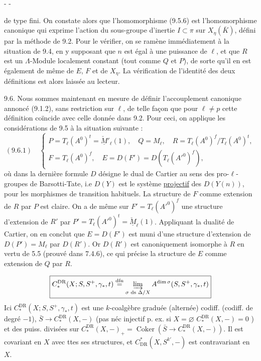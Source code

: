 \begin{center}-  -\end{center}

de type fini. On constate alors que l'homomorphisme (9.5.6) est l'homomorphisme canonique qui exprime l'action du sous-groupe d'inertie $I\subset\pi$ sur $X_\eta(\bar K)$, défini par la méthode de 9.2. Pour le vérifier, on se ramène immédiatement à la situation de 9.4, en y supposant que $n$ est égal à une puissance de $\ell$, et que $R$ est un $\Lambda$-Module localement constant (tout comme $Q$ et $P$), de sorte qu'il en est également de même de $E$, $F$ et de $X_\eta$. La vérification de l'identité des deux définitions est alors laissée au lecteur.

9.6. Nous sommes maintenant en mesure de définir l'accouplement canonique annoncé (9.1.2), sans restriction sur $\ell$, de telle façon que pour $\ell\neq p$ cette définition coïncide avec celle donnée dans 9.2. Pour ceci, on applique les considérations de 9.5 à la situation suivante :
\[
(9.6.1)\quad\left\{\begin{array}{l}
P=T_\ell(A^0)^t=\check{\underline M}'_\ell(1),\quad Q=M_\ell,\quad R=T_\ell(A^0)^f/T_\ell(A^0)^t,\\[2em]
F=T_\ell(A^0)^f,\quad E=D(F')=D(T_\ell(A'^0)^f),
\end{array}\right.
\]
où dans la dernière formule $D$ désigne le dual de Cartier au sens des pro-$\ell$-groupes de Barsotti-Tate, i.e $D(Y)$ est le système \uline{projectif} des $D(Y(n))$, pour les morphismes de transition habituels. La structure de $F$ comme extension de $R$ par $P$ est claire. On a de même sur $F'=T_\ell(A'^0)^f$ une structure d'extension de $R'$ par $P'=T_\ell(A'^0)^t=\check{\underline M}_\ell(1)$. Appliquant la dualité de Cartier, on en conclut que $E=D(F')$ est muni d'une structure d'extension de $D(P')=M_\ell$ par $D(R')$. Or $D(R')$ est canoniquement isomorphe à $R$ en vertu de 5.5 (prouvé dans 7.4.6), ce qui précise la structure de $E$ comme extension de $Q$ par $R$.


\[
\boxed{C_*^{\mathrm{DR}}(X;S,S^+,\gamma_*,t)\overset{\mathrm{dfn}}=\varinjlim_{\sigma\text{ ds }\Delta/X} A^{\dim\sigma}(S,S^+,\gamma_*,t)}
\]
Ici $C_*^{\mathrm{DR}}(X;S,S^+,\gamma_*,t)$ est une $k$-coalgèbre graduée (alternée) codiff. (codiff. de degré $-1$),     $\bar S\longrightarrow C_*^{\mathrm{DR}}(X,-)$  (pas néc injectif p. ex. si $X=\varnothing$ $C_*^{\mathrm{DR}}(X,-)=0$ \unsure{--}) et des puiss. divisées sur  $C_*^{\mathrm{DR}}(X,-)_+=\operatorname{Coker}(\bar S\longrightarrow C_*^{\mathrm{DR}}(X,-))$. Il est covariant en $X$ avec ttes ses structures, et $C^*_{\mathrm{DR}}(X,S^{k'},-)$ est contravariant en $X$. 

